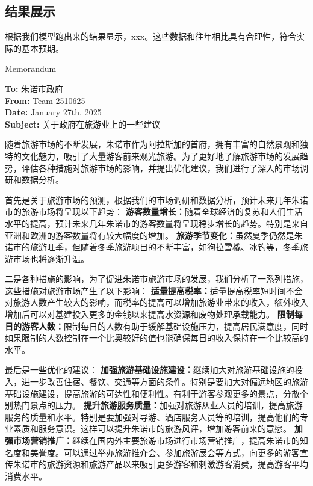 \documentclass[12pt]{article}  %
\begin{document}
\subsection{结果展示}
根据我们模型跑出来的结果显示，xxx。这些数据和往年相比具有合理性，符合实际的基本预期。

\begin{letter}{Memorandum}
\begin{flushleft}  %
\textbf{To:} 朱诺市政府\\
\textbf{From:} Team 2510625\\
\textbf{Date:} January 27th, 2025\\
\textbf{Subject:} 关于政府在旅游业上的一些建议
\end{flushleft}

随着旅游市场的不断发展，朱诺市作为阿拉斯加的首府，拥有丰富的自然景观和独特的文化魅力，吸引了大量游客前来观光旅游。为了更好地了解旅游市场的发展趋势，评估各种措施对旅游市场的影响，并提出优化建议，我们进行了深入的市场调研和数据分析。

首先是关于旅游市场的预测，根据我们的市场调研和数据分析，预计未来几年朱诺市的旅游市场将呈现以下趋势：
\textbf{游客数量增长：}随着全球经济的复苏和人们生活水平的提高，预计未来几年朱诺市的游客数量将呈现稳步增长的趋势。特别是来自亚洲和欧洲的游客数量将有较大幅度的增加。
\textbf{旅游季节变化：}虽然夏季仍然是朱诺市的旅游旺季，但随着冬季旅游项目的不断丰富，如狗拉雪橇、冰钓等，冬季旅游市场也将逐渐升温。

二是各种措施的影响，为了促进朱诺市旅游市场的发展，我们分析了一系列措施，这些措施对旅游市场产生了以下影响：
\textbf{适量提高税率：}适量提高税率短时间不会对旅游人数产生较大的影响，而税率的提高可以增加旅游业带来的收入，额外收入增加后可以对基建投入更多的金钱以来提高水资源和废物处理承载能力。
\textbf{限制每日的游客人数：}限制每日的人数有助于缓解基础设施压力，提高居民满意度，同时如果限制的人数控制在一个比奥较好的值也能确保每日的收入保持在一个比较高的水平。

最后是一些优化的建议：
\textbf{加强旅游基础设施建设：}继续加大对旅游基础设施的投入，进一步改善住宿、餐饮、交通等方面的条件。特别是要加大对偏远地区的旅游基础设施建设，提高旅游的可达性和便利性。有利于游客参观更多的景点，分散个别热门景点的压力。
\textbf{提升旅游服务质量：}加强对旅游从业人员的培训，提高旅游服务的质量和水平。特别是要加强对导游、酒店服务人员等的培训，提高他们的专业素质和服务意识。这样可以提升朱诺市的旅游风评，增加游客前来的意愿。
\textbf{加强市场营销推广：}继续在国内外主要旅游市场进行市场营销推广，提高朱诺市的知名度和美誉度。可以通过举办旅游推介会、参加旅游展会等方式，向更多的游客宣传朱诺市的旅游资源和旅游产品以来吸引更多游客和刺激游客消费，提高游客平均消费水平。

\end{letter}
\clearpage
\end{document}
